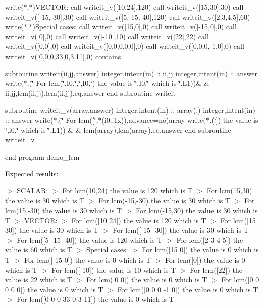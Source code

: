 write($\ast$,$\ast$)\textquotesingle{}V\+E\+C\+T\+OR\+:\textquotesingle{} call writeit\+\_\+v(\mbox{[}10,24\mbox{]},120) call writeit\+\_\+v(\mbox{[}15,30\mbox{]},30) call writeit\+\_\+v(\mbox{[}-\/15,-\/30\mbox{]},30) call writeit\+\_\+v(\mbox{[}5,-\/15,-\/40\mbox{]},120) call writeit\+\_\+v(\mbox{[}2,3,4,5\mbox{]},60) write($\ast$,$\ast$)\textquotesingle{}Special cases\+:\textquotesingle{} call writeit\+\_\+v(\mbox{[}15,0\mbox{]},0) call writeit\+\_\+v(\mbox{[}-\/15,0\mbox{]},0) call writeit\+\_\+v(\mbox{[}0\mbox{]},0) call writeit\+\_\+v(\mbox{[}-\/10\mbox{]},10) call writeit\+\_\+v(\mbox{[}22\mbox{]},22) call writeit\+\_\+v(\mbox{[}0,0\mbox{]},0) call writeit\+\_\+v(\mbox{[}0,0,0,0,0\mbox{]},0) call writeit\+\_\+v(\mbox{[}0,0,0,-\/1,0\mbox{]},0) call writeit\+\_\+v(\mbox{[}0,0,0,33,0,3,11\mbox{]},0) contains

subroutine writeit(ii,jj,answer) integer,intent(in) \+:\+: ii,jj integer,intent(in) \+:\+: answer write($\ast$,\textquotesingle{}(\char`\"{}  For lcm(\char`\"{},I0,\char`\"{},\char`\"{},I0,\char`\"{}) the value is \char`\"{},I0,\char`\"{} which is \char`\"{},L1)\textquotesingle{})\& \& ii,jj,lcm(ii,jj),lcm(ii,jj).eq.\+answer end subroutine writeit

subroutine writeit\+\_\+v(array,answer) integer,intent(in) \+:\+: array(\+:) integer,intent(in) \+:\+: answer write($\ast$,\textquotesingle{}(\char`\"{}  For lcm(\mbox{[}\char`\"{},$\ast$(i0\+:,1x))\textquotesingle{},advance=\textquotesingle{}no\textquotesingle{})array write($\ast$,\textquotesingle{}(\char`\"{}\mbox{]}) the value is \char`\"{},i0,\char`\"{} which is \char`\"{},L1)\textquotesingle{}) \& \& lcm(array),lcm(array).eq.\+answer end subroutine writeit\+\_\+v

end program demo\+\_\+lcm

Expected results\+:

$>$ S\+C\+A\+L\+AR\+: $>$ For lcm(10,24) the value is 120 which is T $>$ For lcm(15,30) the value is 30 which is T $>$ For lcm(-\/15,-\/30) the value is 30 which is T $>$ For lcm(15,-\/30) the value is 30 which is T $>$ For lcm(-\/15,30) the value is 30 which is T $>$ V\+E\+C\+T\+OR\+: $>$ For lcm(\mbox{[}10 24\mbox{]}) the value is 120 which is T $>$ For lcm(\mbox{[}15 30\mbox{]}) the value is 30 which is T $>$ For lcm(\mbox{[}-\/15 -\/30\mbox{]}) the value is 30 which is T $>$ For lcm(\mbox{[}5 -\/15 -\/40\mbox{]}) the value is 120 which is T $>$ For lcm(\mbox{[}2 3 4 5\mbox{]}) the value is 60 which is T $>$ Special cases\+: $>$ For lcm(\mbox{[}15 0\mbox{]}) the value is 0 which is T $>$ For lcm(\mbox{[}-\/15 0\mbox{]}) the value is 0 which is T $>$ For lcm(\mbox{[}0\mbox{]}) the value is 0 which is T $>$ For lcm(\mbox{[}-\/10\mbox{]}) the value is 10 which is T $>$ For lcm(\mbox{[}22\mbox{]}) the value is 22 which is T $>$ For lcm(\mbox{[}0 0\mbox{]}) the value is 0 which is T $>$ For lcm(\mbox{[}0 0 0 0 0\mbox{]}) the value is 0 which is T $>$ For lcm(\mbox{[}0 0 0 -\/1 0\mbox{]}) the value is 0 which is T $>$ For lcm(\mbox{[}0 0 0 33 0 3 11\mbox{]}) the value is 0 which is T

